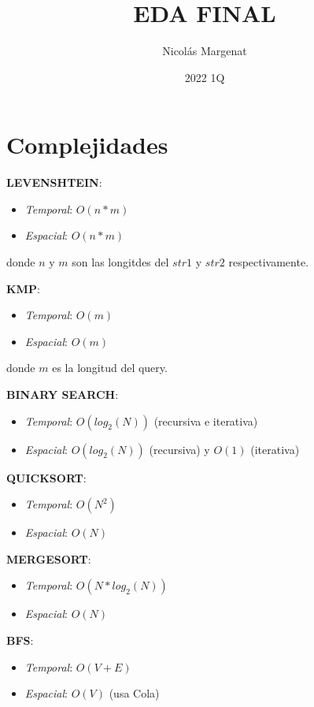 \documentclass{article}
\title{EDA FINAL}
\author{Nicolás Margenat}
\date{2022 1Q}
\newcommand{\breakcol}{\vfill\null \columnbreak}
\begin{document}
\maketitle

\tableofcontents

\newpage
\section{Complejidades}
\begin{multicols}{2}

\textbf{LEVENSHTEIN}:
\begin{itemize}
    \item \emph{Temporal}: $O(n*m)$ 
    \item \emph{Espacial}: $O(n*m)$ 
\end{itemize}
donde $n$ y $m$ son las longitdes del $str1$ y $str2$ respectivamente.

\textbf{KMP}:
\begin{itemize}
    \item \emph{Temporal}: $O(m)$ 
    \item \emph{Espacial}: $O(m)$ 
\end{itemize}
donde $m$ es la longitud del query.

\textbf{BINARY SEARCH}:
\begin{itemize}
    \item \emph{Temporal}: $O(log_2(N))$ (recursiva e iterativa)
    \item \emph{Espacial}: $O(log_2(N))$ (recursiva) y $O(1)$ (iterativa)
\end{itemize}

\textbf{QUICKSORT}:
\begin{itemize}
    \item \emph{Temporal}: $O(N^2)$ 
    \item \emph{Espacial}: $O(N)$ 
\end{itemize}

\textbf{MERGESORT}:
\begin{itemize}
    \item \emph{Temporal}: $O(N*log_2(N))$ 
    \item \emph{Espacial}: $O(N)$ 
\end{itemize}

\breakcol
\textbf{BFS}:
\begin{itemize}
    \item \emph{Temporal}: $O(V + E)$ 
    \item \emph{Espacial}: $O(V)$ (usa Cola)
\end{itemize}


\end{multicols}
\end{document}
